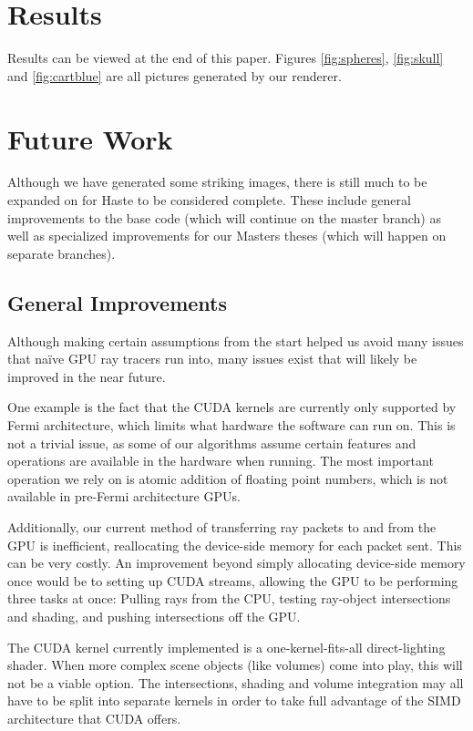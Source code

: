 \documentclass{acmsiggraph}                     %
\begin{document}
\section{Results}
\label{sec:results}

Results can be viewed at the end of this paper.  Figures \ref{fig:spheres}, \ref{fig:skull} 
and \ref{fig:cartblue} are all pictures generated by our renderer.

\section{Future Work}
\label{sec:future}

Although we have generated some striking images, there is still much to be expanded on for
Haste to be considered complete. These include general improvements to the base code (which
will continue on the master branch) as well as specialized improvements for our Masters
theses (which will happen on separate branches).

    \subsection{General Improvements}
    \label{sec:generalimprove}

    Although making certain assumptions from the start helped us avoid many issues that na\"{i}ve 
    GPU ray tracers run into, many issues exist that will likely be improved in the near future.
    
    One example is the fact that the CUDA kernels are currently only supported by Fermi 
    architecture, which limits what hardware the software can run on. This is not a trivial issue,
    as some of our algorithms assume certain features and operations are available in the hardware
    when running. The most important operation we rely on is atomic addition of floating point 
    numbers, which is not available in pre-Fermi architecture GPUs.

    Additionally, our current method of transferring ray packets to and from the GPU is inefficient,
    reallocating the device-side memory for each packet sent. This can be very costly. An
    improvement beyond simply allocating device-side memory once would be to setting up CUDA streams,
    allowing the GPU to be performing three tasks at once: Pulling rays from the CPU,
    testing ray-object intersections and shading, and pushing intersections off the GPU.

    The CUDA kernel currently implemented is a one-kernel-fits-all direct-lighting shader. When more 
    complex scene objects (like volumes) come into play, this will not be a viable option. The
    intersections, shading and volume integration may all have to be split into separate kernels 
    in order to take full advantage of the SIMD architecture that CUDA offers.
\end{document}
